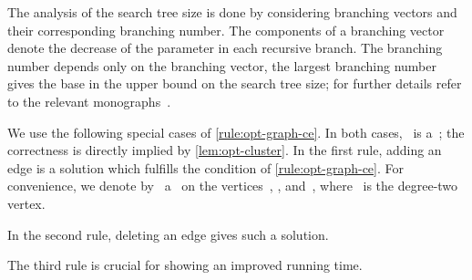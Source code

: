 \documentclass[envcountsame,numbook,smallextended]{svjour3}
\numberwithin{equation}{section}
\numberwithin{figure}{section}
\begin{document}
The analysis of the search tree size is done by considering branching vectors and their corresponding branching number.  The components of a branching vector denote the decrease of the parameter in each recursive branch.  The branching number depends only on the branching vector, the largest branching number gives the base in the upper bound on the search tree size; for further details refer to the relevant monographs~\cite{FK10,Nie06}.

We use the following special cases of \cref{rule:opt-graph-ce}. In both cases, ~is a~; the correctness is directly implied by \cref{lem:opt-cluster}. In the first rule, adding an edge is a solution which fulfills the condition of \cref{rule:opt-graph-ce}. For convenience, we denote by~ a~ on the vertices~, , and~, where ~is the degree-two vertex.
In the second rule, deleting an edge gives such a solution.
The third rule is crucial for showing an improved running time.
\end{document}

